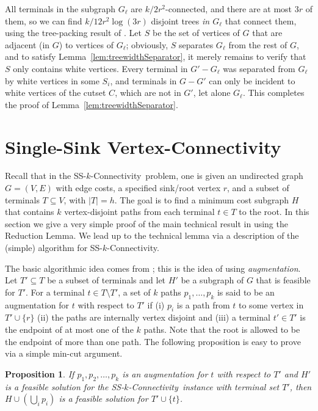 \documentclass[11pt]{article}
\newtheorem{prop}[lemma]{Proposition}
\newcommand{\sskconn}{{\sc SS-$k$-Connectivity}}
\begin{document}
All terminals in the subgraph $G_\ell$ are $k/2r^2$-connected, and
there are at most $3r$ of them, so we can find $k/12 r^2 \log (3r)$
disjoint trees \emph{in $G_\ell$} that connect them, using the
tree-packing result of \cite{cs}. Let $S$ be the set of vertices of
$G$ that are adjacent (in $G$) to vertices of $G_\ell$; obviously, $S$
separates $G_\ell$ from the rest of $G$, and to satisfy
Lemma~\ref{lem:treewidthSeparator}, it merely remains to verify that
$S$ only contains white vertices. Every terminal in $G' - G_\ell$ was
separated from $G_\ell$ by white vertices in some $S_i$, and terminals
in $G - G'$ can only be incident to white vertices of the cutset $C$,
which are not in $G'$, let alone $G_\ell$. This completes the proof of
Lemma~\ref{lem:treewidthSeparator}.


\section{Single-Sink Vertex-Connectivity}\label{sec:kconn}
Recall that in the \sskconn~problem, one is given an undirected graph
$G=(V,E)$ with edge costs, a specified sink/root vertex $r$, and a
subset of terminals $T \subseteq V$, with $|T| = h$.  The goal is to
find a minimum cost subgraph $H$ that contains $k$ vertex-disjoint
paths from each terminal $t \in T$ to the root. In this section we
give a very simple proof of the main technical result in
\cite{ChuzhoyK08} using the Reduction Lemma. We lead up to the technical
lemma via a description of the (simple) algorithm for \sskconn.

The basic algorithmic idea comes from \cite{ChakCK08}; this is the
idea of using \emph{augmentation}. Let $T' \subseteq T$ be a subset of
terminals and let $H'$ be a subgraph of $G$ that is feasible for
$T'$. For a terminal $t \in T \setminus T'$, a set of $k$ paths $p_1,
\ldots, p_k$ is said to be an augmentation for $t$ with respect to
$T'$ if (i) $p_i$ is a path from $t$ to some vertex in $T' \cup \{r\}$
(ii) the paths are internally vertex disjoint and (iii) a terminal $t'
\in T'$ is the endpoint of at most one of the $k$ paths. Note that the
root is allowed to be the endpoint of more than one path. The
following proposition is easy to prove via a simple min-cut argument.

\begin{prop}
  \label{prop:aug}
  If $p_1, p_2, \ldots, p_k$ is an augmentation for $t$ with respect
  to $T'$ and $H'$ is a feasible solution for the \sskconn\ instance
  with terminal set $T'$, then $H \cup (\bigcup_i p_i)$ is a feasible
  solution for $T' \cup \{t\}$.
\end{prop}
\end{document}
